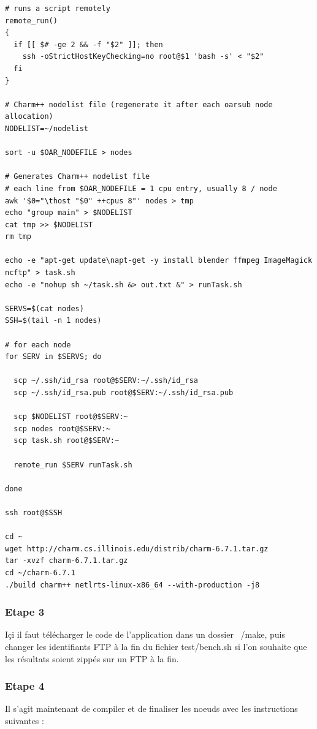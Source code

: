 \documentclass[a4paper, 11pt, titlepage]{article}
\begin{document}
\begin{verbatim}
# runs a script remotely
remote_run()
{
  if [[ $# -ge 2 && -f "$2" ]]; then
    ssh -oStrictHostKeyChecking=no root@$1 'bash -s' < "$2"
  fi
}

# Charm++ nodelist file (regenerate it after each oarsub node allocation)
NODELIST=~/nodelist

sort -u $OAR_NODEFILE > nodes

# Generates Charm++ nodelist file
# each line from $OAR_NODEFILE = 1 cpu entry, usually 8 / node
awk '$0="\thost "$0" ++cpus 8"' nodes > tmp
echo "group main" > $NODELIST
cat tmp >> $NODELIST
rm tmp

echo -e "apt-get update\napt-get -y install blender ffmpeg ImageMagick ncftp" > task.sh
echo -e "nohup sh ~/task.sh &> out.txt &" > runTask.sh

SERVS=$(cat nodes)
SSH=$(tail -n 1 nodes)

# for each node
for SERV in $SERVS; do

  scp ~/.ssh/id_rsa root@$SERV:~/.ssh/id_rsa
  scp ~/.ssh/id_rsa.pub root@$SERV:~/.ssh/id_rsa.pub

  scp $NODELIST root@$SERV:~
  scp nodes root@$SERV:~
  scp task.sh root@$SERV:~

  remote_run $SERV runTask.sh

done

ssh root@$SSH

cd ~
wget http://charm.cs.illinois.edu/distrib/charm-6.7.1.tar.gz
tar -xvzf charm-6.7.1.tar.gz
cd ~/charm-6.7.1
./build charm++ netlrts-linux-x86_64 --with-production -j8
\end{verbatim}



\subsubsection {Etape 3}

Içi il faut télécharger le code de l'application dans un dossier ~/make, puis changer les identifiants FTP à la fin du fichier test/bench.sh si l'on souhaite que les résultats soient zippés sur un FTP à la fin.


\subsubsection {Etape 4}

Il s'agit maintenant de compiler et de finaliser les noeuds avec les instructions suivantes :
\end{document}
